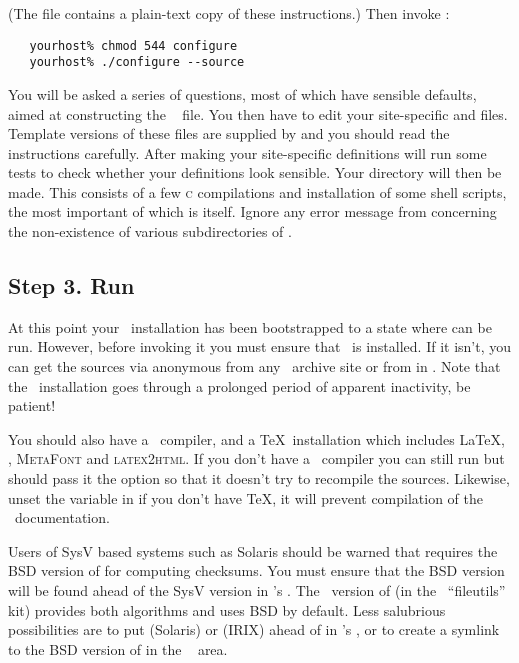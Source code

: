 \noindent
(The  file contains a plain-text copy of these instructions.)
Then invoke :

\begin{verbatim}
   yourhost% chmod 544 configure
   yourhost% ./configure --source
\end{verbatim}

\noindent
You will be asked a series of questions, most of which have sensible defaults,
aimed at constructing the \aipspp\  file.  You then have to
edit your site-specific  and  files.  Template
versions of these files are supplied by  and you should read
the instructions carefully.  After making your site-specific definitions
 will run some tests to check whether your 
definitions look sensible.  Your  directory will then be made.
This consists of a few \textsc{c} compilations and installation of some shell
scripts, the most important of which is  itself.  Ignore any
error message from  concerning the non-existence of various
subdirectories of .

\subsection*{Step 3. Run }

At this point your \aipspp\ installation has been bootstrapped to a state
where  can be run.  However, before invoking it you must ensure
that \rcs\ is installed.  If it isn't, you can get the sources via anonymous
 from any \gnu\ archive site or from  in
.  Note that the \rcs\ installation goes through a prolonged
period of apparent inactivity, be patient!

You should also have a \cplusplus\ compiler, and a \TeX\ installation which
includes \LaTeX, , \textsc{MetaFont} and \textsc{latex2html}.
If you don't have a \cplusplus\ compiler you can still run  but
should pass it the  option so that it doesn't try to recompile the
sources.  Likewise, unset the  variable in  if you
don't have \TeX, it will prevent compilation of the \aipspp\ documentation.

Users of SysV based systems such as Solaris should be warned that
 requires the BSD version of  for computing
checksums.  You must ensure that the BSD version will be found ahead of the
SysV version in 's .  The \gnu\ version of
 (in the \gnu\ ``fileutils'' kit) provides both algorithms and
uses BSD by default.  Less salubrious possibilities are to put 
(Solaris) or  (IRIX) ahead of  in
's , or to create a symlink to the BSD version of
 in the \aipspp\  area.  

